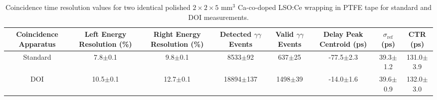 \begin{table}
\caption{\label{tab:referencevals} Coincidence time resolution values for two identical polished $2\times2\times5$ mm$^3$ Ca-co-doped LSO:Ce wrapping in PTFE tape for standard and DOI measurements.}
\begin{tabular}{cccccccc}
Coincidence Apparatus & Left Energy Resolution (\%) & Right Energy Resolution (\%) & Detected $\gamma\gamma$ Events & Valid $\gamma\gamma$ Events & Delay Peak Centroid (ps) & $\sigma_\textrm{ref}$ (ps) & CTR (ps)\\
\hline
Standard &   7.8$\pm$0.1 &   9.8$\pm$0.1 &    8533$\pm$92 &   637$\pm$25 &  -77.5$\pm$2.3 &   39.3$\pm$1.2 &  131.0$\pm$3.9 \\
DOI &  10.5$\pm$0.1 &  12.7$\pm$0.1 &  18894$\pm$137 &  1498$\pm$39 &  -14.0$\pm$1.6 &   39.6$\pm$0.9 &  132.0$\pm$3.0 \\
\hline
\end{tabular}
\end{table}